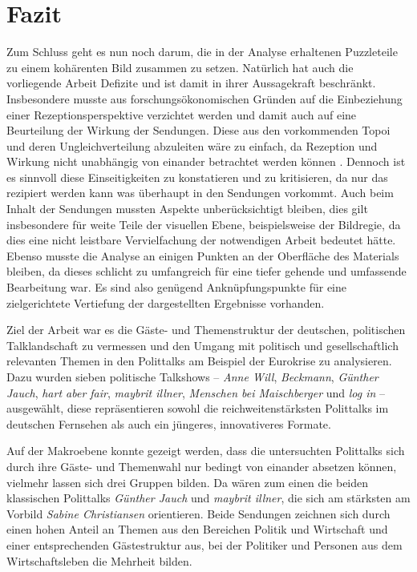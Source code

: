 \chapter{Fazit}

Zum Schluss geht es nun noch darum, die in der Analyse erhaltenen Puzzleteile zu einem kohärenten Bild zusammen zu setzen. Natürlich hat auch die vorliegende Arbeit Defizite und ist damit in ihrer Aussagekraft beschränkt. Insbesondere musste aus forschungsökonomischen Gründen auf die Einbeziehung einer Rezeptionsperspektive verzichtet werden und damit auch auf eine Beurteilung der Wirkung der Sendungen. Diese aus den vorkommenden Topoi und deren Ungleichverteilung abzuleiten wäre zu einfach, da Rezeption und Wirkung nicht unabhängig von einander betrachtet werden können \parencite{bucherGrundlagenInteraktionalenRezeptionstheorie2012}. Dennoch ist es sinnvoll diese Einseitigkeiten zu konstatieren und zu kritisieren, da nur das rezipiert werden kann was überhaupt in den Sendungen vorkommt. Auch beim Inhalt der Sendungen mussten Aspekte unberücksichtigt bleiben, dies gilt insbesondere für weite Teile der visuellen Ebene, beispielsweise der Bildregie, da dies eine nicht leistbare Vervielfachung der notwendigen Arbeit bedeutet hätte. Ebenso musste die Analyse an einigen Punkten an der Oberfläche des Materials bleiben, da dieses schlicht zu umfangreich für eine tiefer gehende und umfassende Bearbeitung war. Es sind also genügend Anknüpfungspunkte für eine zielgerichtete Vertiefung der dargestellten Ergebnisse vorhanden.

Ziel der Arbeit war es die Gäste- und Themenstruktur der deutschen, politischen Talklandschaft zu vermessen und den Umgang mit politisch und gesellschaftlich relevanten Themen in den Polittalks am Beispiel der Eurokrise zu analysieren. Dazu wurden sieben politische Talkshows – \textit{Anne Will}, \textit{Beckmann}, \textit{Günther Jauch}, \textit{hart aber fair}, \textit{maybrit illner}, \textit{Menschen bei Maischberger} und \textit{log in} – ausgewählt, diese repräsentieren sowohl die reichweitenstärksten Polittalks im deutschen Fernsehen als auch ein jüngeres, innovativeres Formate.

Auf der Makroebene konnte gezeigt werden, dass die untersuchten Polittalks sich durch ihre Gäste- und Themenwahl nur bedingt von einander absetzen können, vielmehr lassen sich drei Gruppen bilden. Da wären zum einen die beiden klassischen Polittalks \textit{Günther Jauch} und \textit{maybrit illner}, die sich am stärksten am Vorbild \textit{Sabine Christiansen} orientieren. Beide Sendungen zeichnen sich durch einen hohen Anteil an Themen aus den Bereichen Politik und Wirtschaft und einer entsprechenden Gästestruktur aus, bei der Politiker und Personen aus dem Wirtschaftsleben die Mehrheit bilden.

